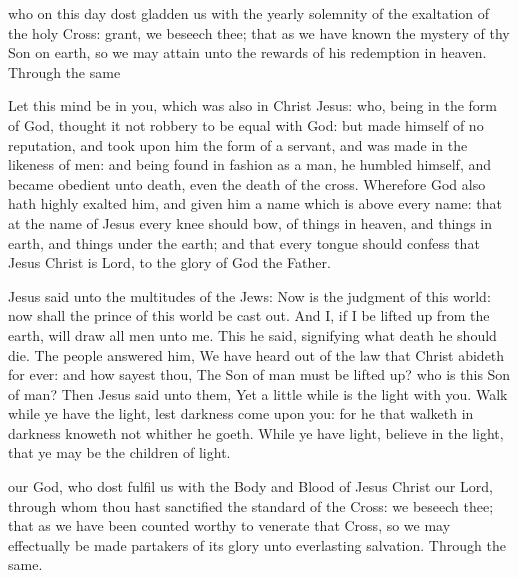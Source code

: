 \collect
{} who on this day dost gladden us with the yearly solemnity of the exaltation of the holy Cross: grant, we beseech thee; that as we have known the mystery of thy Son on earth, so we may attain unto the rewards of his redemption in heaven. Through the same

 Let this mind be in you, which was also in Christ Jesus: who, being in the form of God, thought it not robbery to be equal with God: but made himself of no reputation, and took upon him the form of a servant, and was made in the likeness of men: and being found in fashion as a man, he humbled himself, and became obedient unto death, even the death of the cross. Wherefore God also hath highly exalted him, and given him a name which is above every name:  that at the name of Jesus every knee should bow, of things in heaven, and things in earth, and things under the earth; and that every tongue should confess that Jesus Christ is Lord, to the glory of God the Father.


 Jesus said unto the multitudes of the Jews: Now is the judgment of this world: now shall the prince of this world be cast out. And I, if I be lifted up from the earth, will draw all men unto me. This he said, signifying what death he should die. The people answered him, We have heard out of the law that Christ abideth for ever: and how sayest thou, The Son of man must be lifted up? who is this Son of man? Then Jesus said unto them, Yet a little while is the light with you. Walk while ye have the light, lest darkness come upon you: for he that walketh in darkness knoweth not whither he goeth. While ye have light, believe in the light, that ye may be the children of light.


\secret
{} our God, who dost fulfil us with the Body and Blood of Jesus Christ our Lord, through whom thou hast sanctified the standard of the Cross: we beseech thee; that as we have been counted worthy to venerate that Cross, so we may effectually be made partakers of its glory unto everlasting salvation. Through the same.

